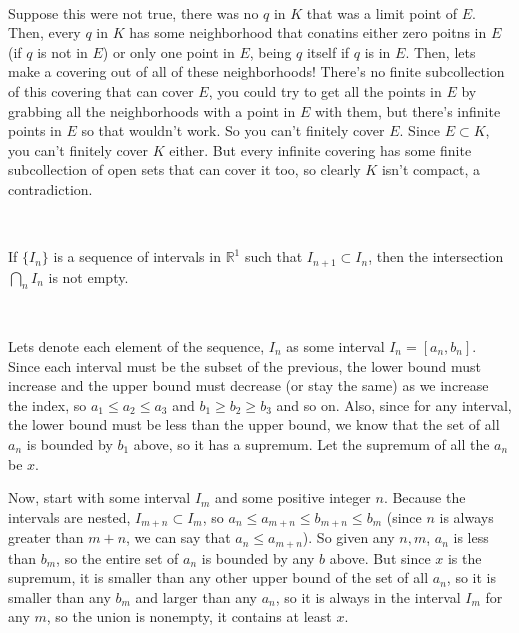 \documentclass{article}
\begin{document}
\begin{customproof}
\

Suppose this were not true, there was no $q$ in $K$ that was a limit point of $E$. Then, every $q$ in $K$ has some neighborhood that conatins either zero poitns in $E$ (if $q$ is not in $E$) or only one point in $E$, being $q$ itself if $q$ is in $E$. Then, lets make a covering out of all of these neighborhoods! There's no finite subcollection of this covering that can cover $E$, you could try to get all the points in $E$ by grabbing all the neighborhoods with a point in $E$ with them, but there's infinite points in $E$ so that wouldn't work. So you can't finitely cover $E$. Since $E \subset K$, you can't finitely cover $K$ either. But every infinite covering has some finite subcollection of open sets that can cover it too, so clearly $K$ isn't compact, a contradiction.
\end{customproof}


\begin{theorem}
\

If $\{I_n\}$ is a sequence of intervals in $\mathbb{R}^1$ such that $I_{n+1} \subset I_n$, then the intersection $\bigcap_n I_n$ is not empty.
\end{theorem}

\begin{customproof}
\

Lets denote each element of the sequence, $I_n$ as some interval $I_n = [a_n,b_n]$. Since each interval must be the subset of the previous, the lower bound must increase and the upper bound must decrease (or stay the same) as we increase the index, so $a_1 \leq a_2 \leq a_3$ and $b_1 \geq b_2 \geq b_3$ and so on. Also, since for any interval, the lower bound must be less than the upper bound, we know that the set of all $a_n$ is bounded by $b_1$ above, so it has a supremum. Let the supremum of all the $a_n$ be $x$.

Now, start with some interval $I_m$ and some positive integer $n$. Because the intervals are nested, $I_{m+n} \subset I_m$, so $a_n \leq a_{m+n} \leq b_{m+n} \leq b_m$ (since $n$ is always greater than $m+n$, we can say that $a_n \leq a_{m+n}$). So given any $n,m$, $a_n$ is less than $b_m$, so the entire set of $a_n$ is bounded by any $b$ above. But since $x$ is the supremum, it is smaller than any other upper bound of the set of all $a_n$, so it is smaller than any $b_m$ and larger than any $a_n$, so it is always in the interval $I_m$ for any $m$, so the union is nonempty, it contains at least $x$.
\end{customproof}
\end{document}
